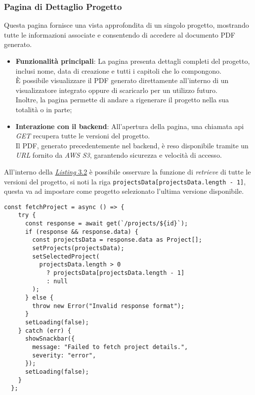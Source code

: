\subsubsection{Pagina di Dettaglio Progetto}
Questa pagina fornisce una vista approfondita di un singolo progetto, mostrando tutte le informazioni associate e consentendo di accedere al documento PDF generato.
\begin{itemize}
    \item \textbf{Funzionalità principali}: La pagina presenta dettagli completi del progetto, inclusi nome, data di creazione e tutti i capitoli che lo compongono.\\
    È possibile visualizzare il PDF generato direttamente all'interno di un visualizzatore integrato oppure di scaricarlo per un utilizzo futuro.\\
    Inoltre, la pagina permette di andare a rigenerare il progetto nella sua totalità o in parte;
    \item \textbf{Interazione con il \gls{backend}}: All'apertura della pagina, una chiamata \gls{api} \textit{GET} recupera tutte le versioni del progetto.\\
    Il PDF, generato precedentemente nel \gls{backend}, è reso disponibile tramite un \textit{URL} fornito da \textit{AWS S3}, garantendo sicurezza e velocità di accesso. 
\end{itemize}

\noindent All'interno della {\hyperref[lst:single-project-page]{\textit{Listing} 3.2}} è possibile osservare la funzione di \textit{retrieve} di tutte le versioni del progetto, si noti la riga \texttt{projectsData[projectsData.length - 1]}, questa va ad impostare come progetto selezionato l'ultima versione disponibile.
\pagebreak
\begin{lstlisting}[caption={Funzione di \textit{retrieve} di tutte le versioni dei progetti}, label={lst:single-project-page}]
  const fetchProject = async () => {
    try {
      const response = await get(`/projects/${id}`);
      if (response && response.data) {
        const projectsData = response.data as Project[];
        setProjects(projectsData);
        setSelectedProject(
          projectsData.length > 0
            ? projectsData[projectsData.length - 1]
            : null
        );
      } else {
        throw new Error("Invalid response format");
      }
      setLoading(false);
    } catch (err) {
      showSnackbar({
        message: "Failed to fetch project details.",
        severity: "error",
      });
      setLoading(false);
    }
  };
  \end{lstlisting}
